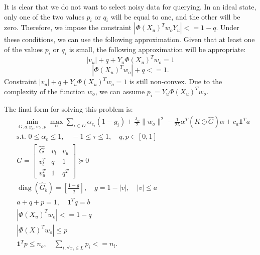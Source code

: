 \documentclass[12pt]{article}
\DeclareMathOperator{\diag}{diag}
\begin{document}
	It is clear that we do not want to select noisy data for querying. In an ideal state, only one of the two values $p_i$ or $q_i$ will be equal to one, and the other will be zero. Therefore, we impose the constraint $|\Phi(X_u)^T w_o Y_u| <= 1 - q$. Under these conditions, we can use the following approximation. Given that at least one of the values $p_i$ or $q_i$ is small, the following approximation will be appropriate:
	\begin{equation}
		|v_u| + q + Y_u \Phi(X_u)^T w_o = 1
	\end{equation}
	\begin{equation}
		|\Phi(X_u)^T w_o| + q <= 1.
	\end{equation}
	Constraint $|v_u| + q + Y_u \Phi(X_u)^T w_o = 1$ is still non-convex. Due to the complexity of the function $w_o$, we can assume $p_i = Y_u \Phi(X_u)^T w_o$.
	
	The final form for solving this problem is:
	\begin{subequations}
		\label{eq:ral-final-form}
		\begin{align}
			&\min_{G, q, y_u, w_o, p} \max_{\alpha} \sum_{i \in D} \alpha_{e_i} (1 - g_i) + \frac{\lambda_o}{2}\|w_o\|^2 - \frac{1}{2\lambda} \alpha^T (K \odot \hat{G}) \alpha + c_a \mathbf{1}^T a \\
			&\text{s.t. } 0 \le \alpha_e \le 1, \quad -1 \le \tau \le 1, \quad q, p \in [0, 1] \\
			&G = \begin{bmatrix}
				\hat{G} & v_l & v_u \\
				v_l^T & q & 1 \\
				v_u^T & 1 & q^T
			\end{bmatrix} \succeq 0 \\
			&\diag(\hat{G}_b) = \left[\frac{1-g}{q}\right], \quad g = 1 - |v|, \quad |v| \le a \\
			&a + q + p = 1, \quad \mathbf{1}^T q = b \\
			&|\Phi(X_u)^T w_o| <= 1 - q \\
			&|\Phi(X)^T w_o| \le p \\
			&\mathbf{1}^T p \le n_o, \quad \sum_{i, \forall x_i \in L} p_i <= n_l.
		\end{align}
	\end{subequations}
	
\end{document}
